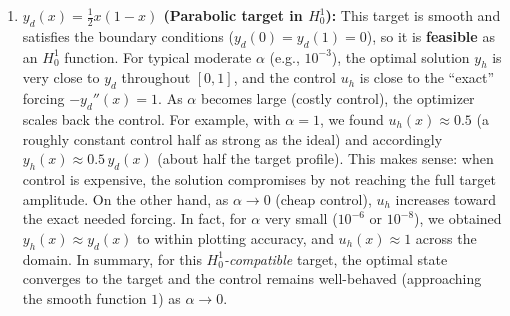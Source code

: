 \begin{enumerate}
	\item \textbf{\(y_d(x)=\frac{1}{2}x(1-x)\) (Parabolic target in \(H^1_0\)):} This target is smooth and satisfies the boundary conditions (\(y_d(0)=y_d(1)=0\)), so it is \textbf{feasible} as an \(H^1_0\) function. For typical moderate \(\alpha\) (e.g., \(10^{-3}\)), the optimal solution \(y_h\) is very close to \(y_d\) throughout \([0,1]\), and the control \(u_h\) is close to the “exact” forcing \(-y_d''(x)=1\). As \(\alpha\) becomes large (costly control), the optimizer scales back the control. For example, with \(\alpha=1\), we found \(u_h(x)\approx 0.5\) (a roughly constant control half as strong as the ideal) and accordingly \(y_h(x)\approx 0.5\,y_d(x)\) (about half the target profile). This makes sense: when control is expensive, the solution compromises by not reaching the full target amplitude. On the other hand, as \(\alpha\to 0\) (cheap control), \(u_h\) increases toward the exact needed forcing. In fact, for \(\alpha\) very small (\(10^{-6}\) or \(10^{-8}\)), we obtained \(y_h(x)\approx y_d(x)\) to within plotting accuracy, and \(u_h(x)\approx 1\) across the domain. In summary, for this \textit{\(H^1_0\)-compatible} target, the optimal state converges to the target and the control remains well-behaved (approaching the smooth function \(1\)) as \(\alpha\to 0\).


\end{enumerate}
